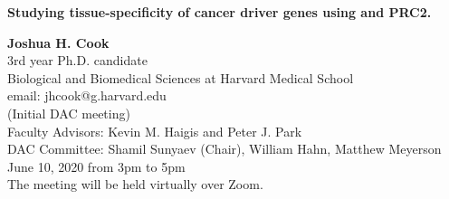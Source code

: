 \begin{titlepage}
    \begin{center}
        \vspace*{2cm}
        \LARGE
        \vspace{3cm}
        \textbf{Studying tissue-specificity of cancer driver genes using \KRAS{} and PRC2.}

        \vspace{3cm}
 
        \Large
        \textbf{Joshua H. Cook} \\
        \vspace{2cm}
        3rd year Ph.D. candidate \\
        Biological and Biomedical Sciences at Harvard Medical School \\
        email: jhcook@g.harvard.edu \\
        (Initial DAC meeting) \\
        Faculty Advisors: Kevin M. Haigis and Peter J. Park \\
        DAC Committee: Shamil Sunyaev (Chair), William Hahn, Matthew Meyerson \\
        June 10, 2020 from 3pm to 5pm \\
        The meeting will be held virtually over Zoom.\\
        \vspace{2cm}
 
    \end{center}
\end{titlepage}

